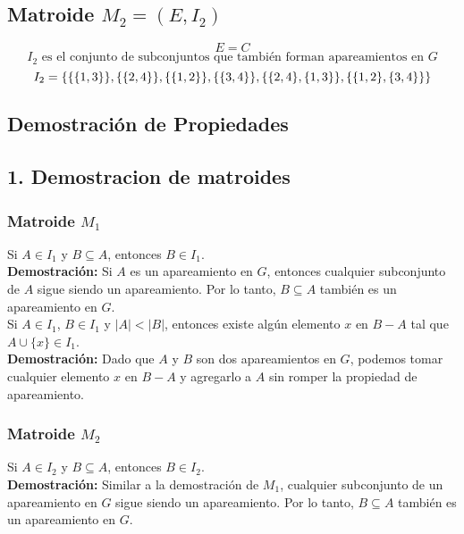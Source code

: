\documentclass{article}
\begin{document}
\subsection*{Matroide $M_2 = (E, I_2)$}
\[ E = C \]
\[ I_2 \text{ es el conjunto de subconjuntos que también forman apareamientos en } G \]
\[
I_2 = \{
\{\{1, 3\}\}, \{\{2, 4\}\}, \{\{1, 2\}\}, \{\{3, 4\}\}, \\
\{\{2, 4\}, \{1, 3\}\}, \{\{1, 2\}, \{3, 4\}\}
\}
\]

\subsection*{Demostración de Propiedades}

\subsection*{1. Demostracion de matroides}

\subsubsection*{Matroide $M_1$}

Si $A \in I_1$ y $B \subseteq A$, entonces $B \in I_1$.\\

\textbf{Demostración:} Si $A$ es un apareamiento en $G$, entonces cualquier subconjunto de $A$ sigue siendo un apareamiento. Por lo tanto, $B \subseteq A$ también es un apareamiento en $G$.\\

Si $A \in I_1$, $B \in I_1$ y $|A| < |B|$, entonces existe algún elemento $x$ en $B - A$ tal que $A \cup \{x\} \in I_1$.\\

\textbf{Demostración:} Dado que $A$ y $B$ son dos apareamientos en $G$, podemos tomar cualquier elemento $x$ en $B - A$ y agregarlo a $A$ sin romper la propiedad de apareamiento.

\subsubsection*{Matroide $M_2$}

Si $A \in I_2$ y $B \subseteq A$, entonces $B \in I_2$.\\

\textbf{Demostración:} Similar a la demostración de $M_1$, cualquier subconjunto de un apareamiento en $G$ sigue siendo un apareamiento. Por lo tanto, $B \subseteq A$ también es un apareamiento en $G$.\\
\end{document}
